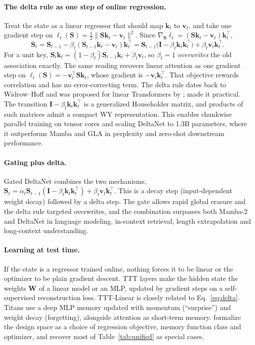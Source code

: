 \documentclass[a4paper]{article}
\newcommand{\T}{^{\top}}
\newcommand{\vk}{\mathbf{k}}
\newcommand{\vv}{\mathbf{v}}
\newcommand{\mS}{\mathbf{S}}
\newcommand{\mI}{\mathbf{I}}
\theoremstyle{plain}
\theoremstyle{remark}
\begin{document}
\paragraph{The delta rule as one step of online regression.} Treat the state as a linear regressor that should map $\vk_t$ to $\vv_t$, and take one gradient step on $\ell_t(\mS)=\tfrac12\lVert\mS\vk_t-\vv_t\rVert^2$. Since $\nabla_{\mS}\ell_t=(\mS\vk_t-\vv_t)\vk_t\T$,
\begin{equation}
\label{eq:delta}
\mS_t=\mS_{t-1}-\beta_t(\mS_{t-1}\vk_t-\vv_t)\vk_t\T=\mS_{t-1}\big(\mI-\beta_t\vk_t\vk_t\T\big)+\beta_t\vv_t\vk_t\T .
\end{equation}
For a unit key, $\mS_t\vk_t=(1-\beta_t)\mS_{t-1}\vk_t+\beta_t\vv_t$, so $\beta_t=1$ \emph{overwrites} the old association exactly. The same reading recovers linear attention as one gradient step on $\ell_t(\mS)=-\vv_t\T\mS\vk_t$, whose gradient is $-\vv_t\vk_t\T$. That objective rewards correlation and has no error-correcting term. The delta rule dates back to Widrow--Hoff and was proposed for linear Transformers by \citet{schlag2021linear}; \citet{yang2024deltanet} made it practical. The transition $\mI-\beta_t\vk_t\vk_t\T$ is a generalized Householder matrix, and products of such matrices admit a compact WY representation. This enables chunkwise parallel training on tensor cores and scaling DeltaNet to 1.3B parameters, where it outperforms Mamba and GLA in perplexity and zero-shot downstream performance.

\paragraph{Gating plus delta.} Gated DeltaNet \citep{yang2025gated} combines the two mechanisms, $\mS_t=\alpha_t\mS_{t-1}(\mI-\beta_t\vk_t\vk_t\T)+\beta_t\vv_t\vk_t\T$. This is a decay step (input-dependent weight decay) followed by a delta step. The gate allows rapid global erasure and the delta rule targeted overwrites, and the combination surpasses both Mamba-2 and DeltaNet in language modeling, in-context retrieval, length extrapolation and long-context understanding.

\paragraph{Learning at test time.} If the state is a regressor trained online, nothing forces it to be linear or the optimizer to be plain gradient descent. TTT layers \citep{sun2024ttt} make the hidden state the weights $\mathbf{W}$ of a linear model or an MLP, updated by gradient steps on a self-supervised reconstruction loss. TTT-Linear is closely related to Eq.~\eqref{eq:delta}. Titans \citep{behrouz2025titans} use a deep MLP memory updated with momentum (\textquotedblleft surprise\textquotedblright) and weight decay (forgetting), alongside attention as short-term memory. \citet{wang2025testtimeregression} formalize the design space as a choice of regression objective, memory function class and optimizer, and recover most of Table~\ref{tab:unified} as special cases.
\end{document}
